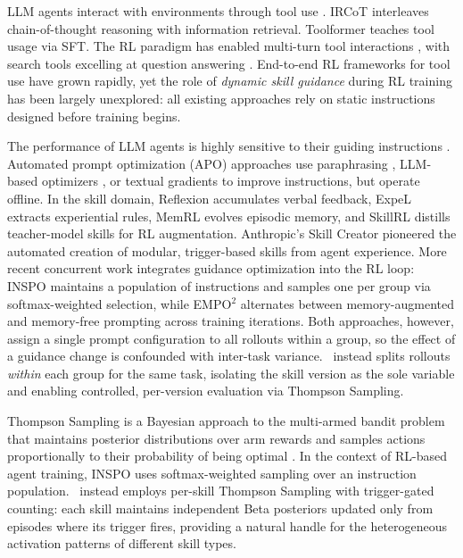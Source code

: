 \documentclass{article}
\theoremstyle{plain}
\theoremstyle{definition}
\theoremstyle{remark}
\begin{document}
LLM agents interact with environments through tool use \citep{yao2023react}. IRCoT \citep{trivedi-etal-2023-interleaving} interleaves chain-of-thought reasoning \citep{wei2022chain} with information retrieval. Toolformer \citep{schick2023toolformer} teaches tool usage via SFT. The RL paradigm has enabled multi-turn tool interactions \citep{feng2025retool, li2025torl}, with search tools excelling at question answering \citep{jin2025search, song2025r1}. End-to-end RL frameworks for tool use \citep{xue2025simpletir, jiang2025verltool} have grown rapidly, yet the role of \textit{dynamic skill guidance} during RL training has been largely unexplored: all existing approaches rely on static instructions designed before training begins.

The performance of LLM agents is highly sensitive to their guiding instructions \citep{zhou2025multi}. Automated prompt optimization (APO) approaches use paraphrasing \citep{zhou2023large}, LLM-based optimizers \citep{yang2024large}, or textual gradients \citep{pryzant-etal-2023-automatic, 2025textgrad} to improve instructions, but operate offline. In the skill domain, Reflexion \citep{shinn2023reflexion} accumulates verbal feedback, ExpeL \citep{zhao2024expel} extracts experiential rules, MemRL \citep{zhang2026memrl} evolves episodic memory, and SkillRL \citep{xia2025skillrl} distills teacher-model skills for RL augmentation. Anthropic's Skill Creator \citep{anthropic2025skillcreator} pioneered the automated creation of modular, trigger-based skills from agent experience. More recent concurrent work integrates guidance optimization into the RL loop: INSPO \citep{zhou2025inspo} maintains a population of instructions and samples one per group via softmax-weighted selection, while EMPO$^2$ \citep{liu2026exploratory} alternates between memory-augmented and memory-free prompting across training iterations. Both approaches, however, assign a single prompt configuration to all rollouts within a group, so the effect of a guidance change is confounded with inter-task variance. \ours~instead splits rollouts \textit{within} each group for the same task, isolating the skill version as the sole variable and enabling controlled, per-version evaluation via Thompson Sampling.

Thompson Sampling \citep{thompson1933likelihood} is a Bayesian approach to the multi-armed bandit problem that maintains posterior distributions over arm rewards and samples actions proportionally to their probability of being optimal \citep{russo2018tutorial}. In the context of RL-based agent training, INSPO \citep{zhou2025inspo} uses softmax-weighted sampling over an instruction population. \ours~instead employs per-skill Thompson Sampling with trigger-gated counting: each skill maintains independent Beta posteriors updated only from episodes where its trigger fires, providing a natural handle for the heterogeneous activation patterns of different skill types.
\end{document}
